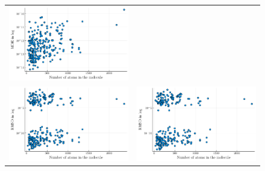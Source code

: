 \documentclass[a4paper,11pt]{article}
\begin{document}
\begin{figure}[H]
\begin{tabular}{cc}
			\includegraphics[scale=0.55]{figures/MDEQuaternionAll.pdf} \\
			\includegraphics[scale=0.55]{figures/RMSDMatrixAll.pdf} &
			\includegraphics[scale=0.55]{figures/RMSDQuaternionAll.pdf} \\

\end{tabular}
\end{figure}
\end{document}
